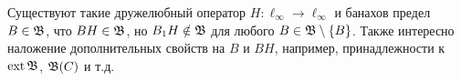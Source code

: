 \begin{hypothesis}
	Существуют такие дружелюбный оператор $H:\ell_\infty\to\ell_\infty$ и банахов предел $B\in \mathfrak{B}$,
	что $BH \in \mathfrak{B}$, но $B_1 H \notin \mathfrak{B}$ для любого $B\in \mathfrak{B}\setminus\{B\}$.
	Также интересно наложение дополнительных свойств на $B$ и $BH$, например, принадлежности к $\operatorname{ext}\mathfrak{B}$, $\mathfrak{B}(C)$ и т.д.
\end{hypothesis}
